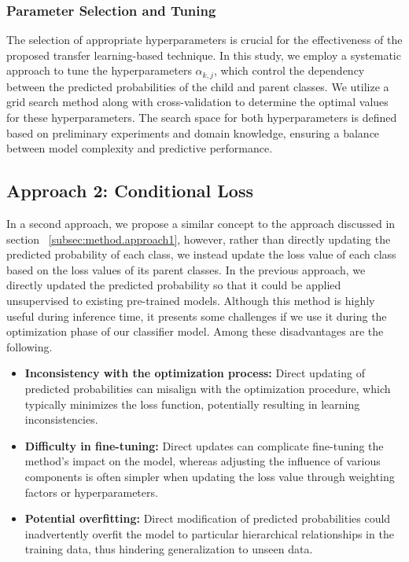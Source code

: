 \subsubsection{Parameter Selection and Tuning}
The selection of appropriate hyperparameters is crucial for the effectiveness of the proposed transfer learning-based technique. In this study, we employ a systematic approach to tune the hyperparameters $\alpha_{k,j} $, which control the dependency between the predicted probabilities of the child and parent classes. We utilize a grid search method along with cross-validation to determine the optimal values for these hyperparameters. The search space for both hyperparameters is defined based on preliminary experiments and domain knowledge, ensuring a balance between model complexity and predictive performance.

\subsection{Approach 2: Conditional Loss}\label{subsec:taxonomy.method.approach2}
In a second approach, we propose a similar concept to the approach discussed in section ~\ref{subsec:method.approach1}, however, rather than directly updating the predicted probability of each class, we instead update the loss value of each class based on the loss values of its parent classes. In the previous approach, we directly updated the predicted probability so that it could be applied unsupervised to existing pre-trained models. Although this method is highly useful during inference time, it presents some challenges if we use it during the optimization phase of our classifier model. Among these disadvantages are the following.
\begin{itemize}
    \item \textbf{Inconsistency with the optimization process: } Direct updating of predicted probabilities can misalign with the optimization procedure, which typically minimizes the loss function, potentially resulting in learning inconsistencies.
    \item \textbf{Difficulty in fine-tuning:} Direct updates can complicate fine-tuning the method's impact on the model, whereas adjusting the influence of various components is often simpler when updating the loss value through weighting factors or hyperparameters.
    \item \textbf{Potential overfitting:} Direct modification of predicted probabilities could inadvertently overfit the model to particular hierarchical relationships in the training data, thus hindering generalization to unseen data.
\end{itemize}

